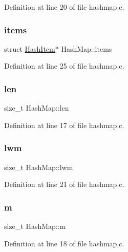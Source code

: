 Definition at line 20 of file hashmap.\+c.

\mbox{\label{structHashMap_aa763bbbe8b195b0070c3d2e2c1c4e4c2}} 
\subsubsection{\texorpdfstring{items}{items}}
{\footnotesize\ttfamily struct \mbox{\hyperlink{structHashItem}{Hash\+Item}}$\ast$ Hash\+Map\+::items}



Definition at line 25 of file hashmap.\+c.

\mbox{\label{structHashMap_a464e5e54144c37706fe47c69371150a0}} 
\subsubsection{\texorpdfstring{len}{len}}
{\footnotesize\ttfamily size\+\_\+t Hash\+Map\+::len}



Definition at line 17 of file hashmap.\+c.

\mbox{\label{structHashMap_a5612a2ea2ff70d737e073799a8c6f14c}} 
\subsubsection{\texorpdfstring{lwm}{lwm}}
{\footnotesize\ttfamily size\+\_\+t Hash\+Map\+::lwm}



Definition at line 21 of file hashmap.\+c.

\mbox{\label{structHashMap_aa2de9d8ff82650c9a88673cfa909932d}} 
\subsubsection{\texorpdfstring{m}{m}}
{\footnotesize\ttfamily size\+\_\+t Hash\+Map\+::m}



Definition at line 18 of file hashmap.\+c.

